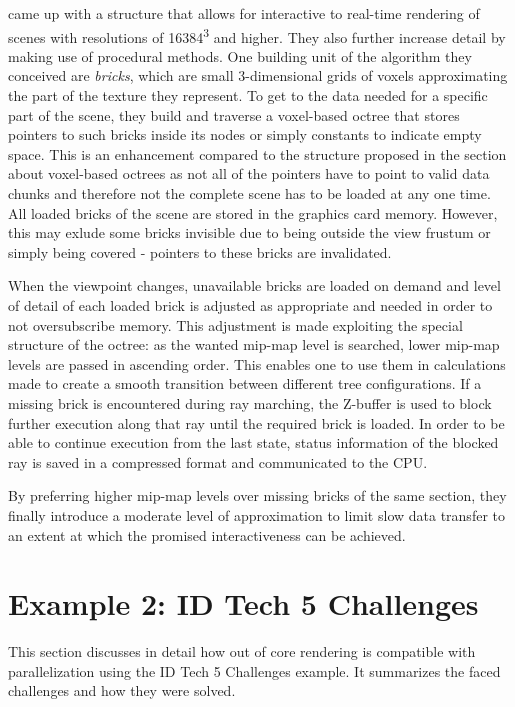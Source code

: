 \cite{Crassin:2009:GRS:1507149.1507152} came up with a structure that allows for interactive to real-time rendering of scenes with resolutions of 16384\textsuperscript{3} and higher. They also further increase detail by making use of procedural methods. One building unit of the algorithm they conceived are \textit{bricks}, which are small 3-dimensional grids of voxels approximating the part of the texture they represent. To get to the data needed for a specific part of the scene, they build and traverse a voxel-based octree that stores pointers to such bricks inside its nodes or simply constants to indicate empty space. This is an enhancement compared to the structure proposed in the section about voxel-based octrees as not all of the pointers have to point to valid data chunks and therefore not the complete scene has to be loaded at any one time. All loaded bricks of the scene are stored in the graphics card memory. However, this may exlude some bricks invisible due to being outside the view frustum or simply being covered - pointers to these bricks are invalidated. 

When the viewpoint changes, unavailable bricks are loaded on demand and level of detail of each loaded brick is adjusted as appropriate and needed in order to not oversubscribe memory. This adjustment is made exploiting the special structure of the octree: as the wanted mip-map level is searched, lower mip-map levels are passed in ascending order. This enables one to use them in calculations made to create a smooth transition between different tree configurations. If a missing brick is encountered during ray marching, the Z-buffer is used to block further execution along that ray until the required brick is loaded. In order to be able to continue execution from the last state, status information of the blocked ray is saved in a compressed format and communicated to the CPU.

By preferring higher mip-map levels over missing bricks of the same section, they finally introduce a moderate level of approximation to limit slow data transfer to an extent at which the promised interactiveness can be achieved.

\section{Example 2: ID Tech 5 Challenges}

This section discusses in detail how out of core rendering is compatible with parallelization using the ID Tech 5 Challenges example. It summarizes the faced challenges and how they were solved. 

